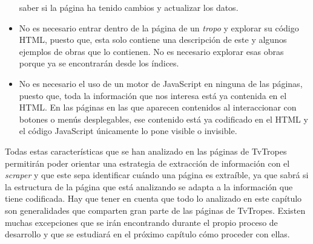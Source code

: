 \begin{itemize}
    saber si la página ha tenido cambios y actualizar los datos.
    \item No es necesario entrar dentro de la página de un \textit{tropo} y
    explorar su código HTML, puesto que, esta solo contiene una descripción de
    este y algunos ejemplos de obras que lo contienen. No es necesario explorar
    esas obras porque ya se encontrarán desde los índices.
    \item No es necesario el uso de un motor de JavaScript en ninguna de las
    páginas, puesto que, toda la información que nos interesa está ya contenida
    en el HTML. En las páginas en las que aparecen contenidos al interaccionar
    con botones o menús desplegables, ese contenido está ya codificado en el
    HTML y el código JavaScript únicamente lo pone visible o invisible.
\end{itemize}

Todas estas características que se han analizado en las páginas de TvTropes
permitirán poder orientar una estrategia de extracción de información con el
\textit{scraper} y que este sepa identificar cuándo una página es extraíble, ya
que sabrá si la estructura de la página que está analizando se adapta a la
información que tiene codificada. Hay que tener en cuenta que todo lo analizado
en este capítulo son generalidades que comparten gran parte de las páginas de
TvTropes. Existen muchas excepciones que se irán encontrando durante el propio
proceso de desarrollo y que se estudiará en el próximo capítulo cómo proceder
con ellas.